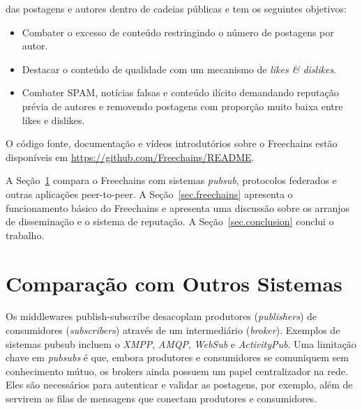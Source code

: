 \documentclass[12pt]{article}
\newcommand{\FC} {Freechains\xspace}
\begin{document}
das postagens e autores dentro de cadeias públicas e tem os seguintes
objetivos:
%
\begin{itemize}
\item Combater o excesso de conteúdo restringindo o número de postagens por autor.
\item Destacar o conteúdo de qualidade com um mecanismo de \emph{likes \& dislikes}.
\item Combater SPAM, notícias falsas e conteúdo ilícito demandando reputação
      prévia de autores e removendo postagens com proporção muito baixa entre
      likes e dislikes.
\end{itemize}
%
O código fonte, documentação e vídeos introdutórios sobre o \FC estão
disponíveis em \url{https://github.com/Freechains/README}.

A Seção~\ref{sec.related} compara o \FC com sistemas \emph{pubsub}, protocolos
federados e outras aplicações peer-to-peer.
A Seção~\ref{sec.freechains} apresenta o funcionamento básico do \FC e
apresenta uma discussão sobre os arranjos de disseminação e o sistema de
reputação.
A Seção~\ref{sec.conclusion} conclui o trabalho.

\section{Comparação com Outros Sistemas}
\label{sec.related}



Os middlewares publish-subscribe desacoplam produtores (\emph{publishers}) de
consumidores (\emph{subscribers}) através de um intermediário (\emph{broker}).
Exemplos de sistemas pubsub incluem o \emph{XMPP}, \emph{AMQP}, \emph{WebSub} e
\emph{ActivityPub}.
Uma limitação chave em \emph{pubsubs} é que, embora produtores e consumidores
se comuniquem sem conhecimento mútuo, os brokers ainda possuem um papel
centralizador na rede.
Eles são necessários para autenticar e validar as postagens, por exemplo, além
de servirem as filas de mensagens que conectam produtores e consumidores.
\end{document}
